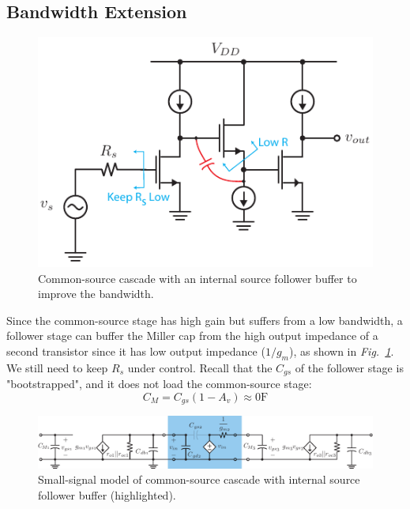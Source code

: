 \subsection{Bandwidth Extension}
\begin{figure}[tb]
\centering
\includegraphics[scale=1]{55cs_cd_cs_casc}
\caption{Common-source cascade with an internal source follower buffer to improve the bandwidth.} \label{fig:55cs_cd_cs_casc}
\end{figure}
Since the common-source stage has high gain but suffers from a low bandwidth, a follower stage can buffer the Miller cap from the high output impedance of a second transistor since it has low output impedance ($1/g_m$), as shown in \emph{Fig.~\ref{fig:55cs_cd_cs_casc}}.  We still need to keep $R_s$ under control.  Recall that the $C_{gs}$ of the follower stage is "bootstrapped", and it does not load the common-source stage:
\begin{equation}
	C_M = C_{gs} (1 - A_v) \approx 0 \mathrm{F}
\end{equation}
\begin{figure}[tb]
\centering
\includegraphics[width=\columnwidth]{5cs_cd_cs_casc_ss_miller}
\caption{Small-signal model of common-source cascade with internal source follower buffer (highlighted).}
\label{fig:5cs_cd_cs_casc_ss_miller}
\end{figure}
